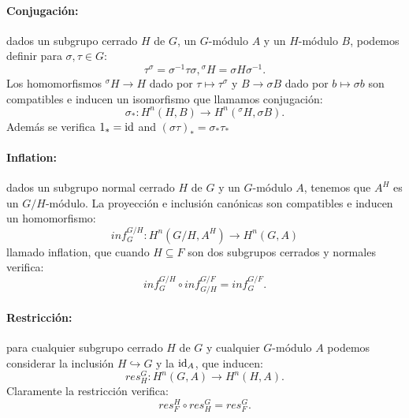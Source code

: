 \documentclass[a4paper,12pt, leqno]{article}
\begin{document}
	\paragraph{Conjugación:} dados un subgrupo cerrado $H$ de $G$, un $G$-módulo $A$ y un $H$-módulo $B$, podemos definir para $\sigma,\tau \in G$:
	\begin{equation*}
	\tau^{\sigma}=\sigma^{-1}\tau \sigma,{}^{\sigma}H=\sigma H \sigma^{-1}.
	\end{equation*}
	Los homomorfismos $^{\sigma}H \rightarrow H$ dado por $\tau \mapsto \tau^{\sigma}$ y $B \rightarrow \sigma B$ dado por $b \mapsto \sigma b$ son compatibles e inducen un  isomorfismo que llamamos conjugación:
	\begin{equation*}
	\sigma_* : H^n(H,B) \rightarrow H^n(^{\sigma}H,\sigma B).
	\end{equation*}
	Además se verifica $1_* = \mathrm{id}$ and $(\sigma \tau)_*=\sigma_* \tau_*$
	\paragraph{Inflation:} dados un subgrupo normal cerrado $H$ de $G$ y un $G$-módulo $A$, tenemos que $A^H$ es un $G/H$-módulo. La proyección e inclusión canónicas son compatibles e inducen un homomorfismo:
	\begin{equation*}
	inf_G^{G/H}:H^n(G/H,A^H)\rightarrow H^n(G,A)
	\end{equation*}
	llamado inflation, que cuando $H\subseteq F$ son dos subgrupos cerrados y normales verifica:
	\begin{equation*}
	inf_G^{G/H} \circ inf_{G/H}^{G/F} = inf_G^{G/F}.
	\end{equation*}
	\paragraph{Restricción:} para cualquier subgrupo cerrado $H$ de $G$ y cualquier $G$-módulo $A$ podemos considerar la inclusión $H \hookrightarrow G$ y la $\mathrm{id}_A$, que inducen:
	\begin{equation*}
	res_H^G: H^n(G,A) \rightarrow H^n(H,A).
	\end{equation*}
	Claramente la restricción verifica:
	\begin{equation*}
	res_F^{H} \circ res_{H}^{G} = res_F^{G}.
	\end{equation*}
\end{document}
